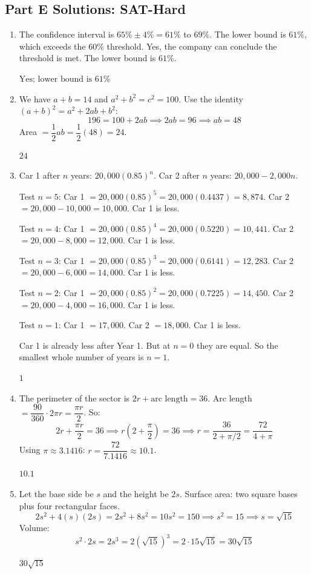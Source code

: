 \documentclass[14pt]{extarticle}
\begin{document}
\subsection*{Part E Solutions: SAT-Hard}
\begin{enumerate}
  \item The confidence interval is \(65\% \pm 4\% = 61\%\) to \(69\%\). The lower bound is \(61\%\), which exceeds the \(60\%\) threshold. Yes, the company can conclude the threshold is met. The lower bound is \(61\%\).

  \(\boxed{\text{Yes; lower bound is } 61\%}\)

  \item We have \(a + b = 14\) and \(a^2 + b^2 = c^2 = 100\). Use the identity \((a+b)^2 = a^2 + 2ab + b^2\):
  \[
  196 = 100 + 2ab \implies 2ab = 96 \implies ab = 48
  \]
  Area \(= \dfrac{1}{2}ab = \dfrac{1}{2}(48) = 24\).

  \(\boxed{24}\)

  \item Car 1 after \(n\) years: \(20{,}000(0.85)^n\). Car 2 after \(n\) years: \(20{,}000 - 2{,}000n\).

  Test \(n = 5\): Car 1 \(= 20{,}000(0.85)^5 = 20{,}000(0.4437) = 8{,}874\). Car 2 \(= 20{,}000 - 10{,}000 = 10{,}000\). Car 1 is less.

  Test \(n = 4\): Car 1 \(= 20{,}000(0.85)^4 = 20{,}000(0.5220) = 10{,}441\). Car 2 \(= 20{,}000 - 8{,}000 = 12{,}000\). Car 1 is less.

  Test \(n = 3\): Car 1 \(= 20{,}000(0.85)^3 = 20{,}000(0.6141) = 12{,}283\). Car 2 \(= 20{,}000 - 6{,}000 = 14{,}000\). Car 1 is less.

  Test \(n = 2\): Car 1 \(= 20{,}000(0.85)^2 = 20{,}000(0.7225) = 14{,}450\). Car 2 \(= 20{,}000 - 4{,}000 = 16{,}000\). Car 1 is less.

  Test \(n = 1\): Car 1 \(= 17{,}000\). Car 2 \(= 18{,}000\). Car 1 is less.

  Car 1 is already less after Year 1. But at \(n = 0\) they are equal. So the smallest whole number of years is \(n = 1\).

  \(\boxed{1}\)

  \item The perimeter of the sector is \(2r + \text{arc length} = 36\). Arc length \(= \dfrac{90}{360} \cdot 2\pi r = \dfrac{\pi r}{2}\). So:
  \[
  2r + \frac{\pi r}{2} = 36 \implies r\left(2 + \frac{\pi}{2}\right) = 36 \implies r = \frac{36}{2 + \pi/2} = \frac{72}{4 + \pi}
  \]
  Using \(\pi \approx 3.1416\): \(r = \dfrac{72}{7.1416} \approx 10.1\).

  \(\boxed{10.1}\)

  \item Let the base side be \(s\) and the height be \(2s\). Surface area: two square bases plus four rectangular faces.
  \[
  2s^2 + 4(s)(2s) = 2s^2 + 8s^2 = 10s^2 = 150 \implies s^2 = 15 \implies s = \sqrt{15}
  \]
  Volume:
  \[
  s^2 \cdot 2s = 2s^3 = 2(\sqrt{15})^3 = 2 \cdot 15\sqrt{15} = 30\sqrt{15}
  \]

  \(\boxed{30\sqrt{15}}\)
\end{enumerate}

\end{document}

